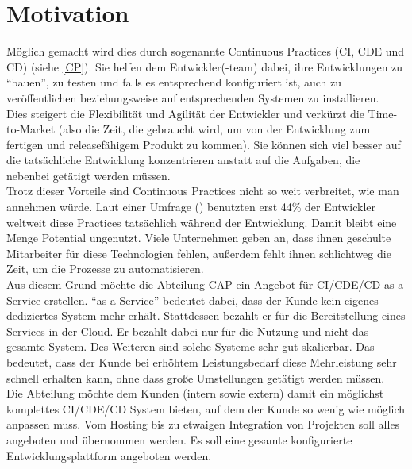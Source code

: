 \section{Motivation}
Möglich gemacht wird dies durch sogenannte Continuous Practices (\ac{CI}, \ac{CDE} und \ac{CD}) (siehe \ref{CP}). Sie helfen dem Entwickler(-team) dabei, ihre Entwicklungen zu \enquote{bauen}, zu testen und falls es entsprechend konfiguriert ist, auch zu veröffentlichen beziehungsweise auf entsprechenden Systemen zu installieren.\\ Dies steigert die Flexibilität und Agilität der Entwickler und verkürzt die Time-to-Market (also die Zeit, die gebraucht wird, um von der Entwicklung zum fertigen und releasefähigem Produkt zu kommen). Sie können sich viel besser auf die tatsächliche Entwicklung konzentrieren anstatt auf die Aufgaben, die nebenbei getätigt werden müssen.\\ Trotz dieser Vorteile sind Continuous Practices nicht so weit verbreitet, wie man annehmen würde. Laut einer Umfrage (\cite{JetBrains.2016}) benutzten erst 44\% der Entwickler weltweit diese Practices tatsächlich während der Entwicklung.\autocite[Vgl.][]{JetBrains.2016}  Damit bleibt eine Menge Potential ungenutzt. Viele Unternehmen geben an, dass ihnen geschulte Mitarbeiter für diese Technologien fehlen, außerdem fehlt ihnen schlichtweg die Zeit, um die Prozesse zu automatisieren.\autocite[Vgl.][]{Claranet.2016}\\ Aus diesem Grund möchte die Abteilung \ac{CAP} ein Angebot für \ac{CI}/\ac{CDE}/\ac{CD} as a Service erstellen. \enquote{as a Service} bedeutet dabei, dass der Kunde kein eigenes dediziertes System mehr erhält. Stattdessen bezahlt er für die Bereitstellung eines Services in der Cloud. Er bezahlt dabei nur für die Nutzung und nicht das gesamte System. Des Weiteren sind solche Systeme sehr gut skalierbar. Das bedeutet, dass der Kunde bei erhöhtem Leistungsbedarf diese Mehrleistung sehr schnell erhalten kann, ohne dass große Umstellungen getätigt werden müssen.\\ Die Abteilung möchte dem Kunden (intern sowie extern) damit ein möglichst komplettes \ac{CI}/\ac{CDE}/\ac{CD} System bieten, auf dem der Kunde so wenig wie möglich anpassen muss. Vom Hosting bis zu etwaigen Integration von Projekten soll alles angeboten und übernommen werden. Es soll eine gesamte konfigurierte Entwicklungsplattform angeboten werden.

